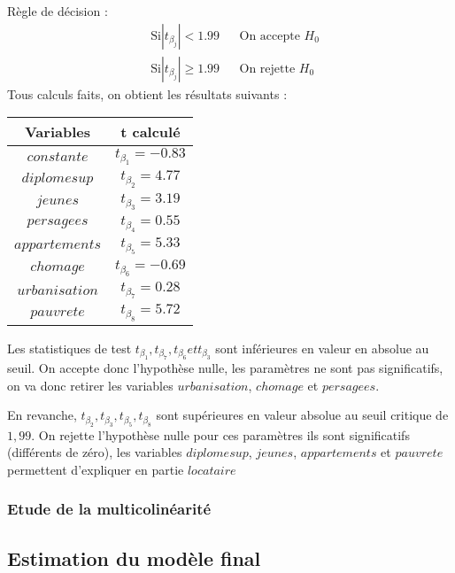 \documentclass[]{article}
\begin{document}
Règle de décision : 
\begin{align*}
    &\text{Si} |t_{\beta_j}| < 1.99 & &\text{On accepte } H_{0}\\
    &\text{Si} |t_{\beta_j}| \geq 1.99 & &\text{On rejette } H_{0}
\end{align*}
Tous calculs faits, on obtient les résultats suivants :
\begin{table}[H]
    \centering
    \begin{tabular}{|c|c|} 
    \hline
    Variables      & t calculé  \\ 
    \hline
    $constante$    & $t_{\beta_1} =-0.83$      \\
    \hline
    $diplomesup$   & $t_{\beta_2} = 4.77$       \\ 
    \hline
    $jeunes$       & $t_{\beta_3} =3.19$       \\ 
    \hline
    $persagees$    & $t_{\beta_4} =0.55$       \\ 
    \hline
    $appartements$ & $t_{\beta_5} =5.33$       \\ 
    \hline
    $chomage$      & $t_{\beta_6} =-0.69$      \\ 
    \hline
    $urbanisation$ & $t_{\beta_7} =0.28$       \\ 
    \hline
    $pauvrete$     & $t_{\beta_8} =5.72$       \\ 
    \hline
    \end{tabular}
\end{table}
Les statistiques de test $t_{\beta_1},t_{\beta_7},t_{\beta_6} et t_{\beta_3}$ sont inférieures en valeur en absolue au seuil. On accepte donc l'hypothèse nulle,
les paramètres ne sont pas significatifs, on va donc retirer les variables $urbanisation$, $chomage$ et $persagees$.

En revanche, $t_{\beta_2}, t_{\beta_3}, t_{\beta_5}, t_{\beta_8}$ sont supérieures en valeur absolue au seuil critique de $1,99$. On rejette l'hypothèse nulle pour ces paramètres
ils sont significatifs (différents de zéro), les variables $diplomesup$, $jeunes$, $appartements$ et $pauvrete$ permettent d'expliquer en partie $locataire$
\subsubsection{Etude de la multicolinéarité}

\subsection{Estimation du modèle final}
\end{document}

